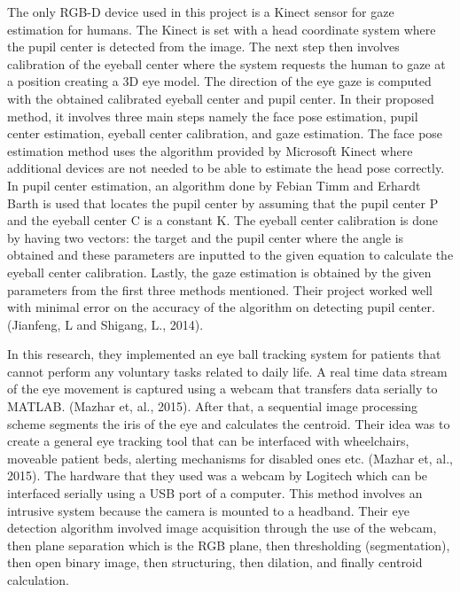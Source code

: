 The only RGB-D device used in this project is a Kinect sensor for gaze estimation for humans. The Kinect is set with a head coordinate system where the pupil center is detected from the image. The next step then involves calibration of the eyeball center where the system requests the human to gaze at a position creating a 3D eye model. The direction of the eye gaze is computed with the obtained calibrated eyeball center and pupil center. In their proposed method, it involves three main steps namely the face pose estimation, pupil center estimation, eyeball center calibration, and gaze estimation. The face pose estimation method uses the algorithm provided by Microsoft Kinect where additional devices are not needed to be able to estimate the head pose correctly. In pupil center estimation, an algorithm done by Febian Timm and Erhardt Barth is used that locates the pupil center by assuming that the pupil center P and the eyeball center C is a constant K. The eyeball center calibration is done by having two vectors: the target and the pupil center where the angle is obtained and these parameters are inputted to the given equation to calculate the eyeball center calibration. Lastly, the gaze estimation is obtained by the given parameters from the first three methods mentioned. Their project worked well with minimal error on the accuracy of the algorithm on detecting pupil center. (Jianfeng, L and Shigang, L., 2014).
\newline

In this research, they implemented an eye ball tracking system for patients that cannot perform any voluntary tasks related to daily life. A real time data stream of the eye movement is captured using a webcam that transfers data serially to MATLAB. (Mazhar et, al., 2015). After that, a sequential image processing scheme segments the iris of the eye and calculates the centroid. Their idea was to create a general eye tracking tool that can be interfaced with wheelchairs, moveable patient beds, alerting mechanisms for disabled ones etc. (Mazhar et, al., 2015). The hardware that they used was a webcam by Logitech which can be interfaced serially using a USB port of a computer. This method involves an intrusive system because the camera is mounted to a headband. Their eye detection algorithm involved image acquisition through the use of the webcam, then plane separation which is the RGB plane, then thresholding (segmentation), then open binary image, then structuring, then dilation, and finally centroid calculation.

